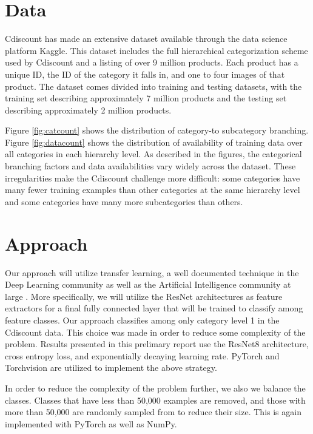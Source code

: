 \documentclass[10pt,twocolumn,letterpaper]{article}
\begin{document}
\section{Data}




Cdiscount has made an extensive dataset available through the data science platform Kaggle.
This dataset includes the full hierarchical categorization scheme used by Cdiscount and a listing of over 9 million products.
Each product has a unique ID, the ID of the category it falls in, and one to four images of that product.
The dataset comes divided into training and testing datasets, with the training set describing approximately 7 million products and the testing set describing approximately 2 million products.

Figure \ref{fig:catcount} shows the distribution of category-to subcategory branching.
Figure \ref{fig:datacount} shows the distribution of availability of training data over all categories in each hierarchy level.
As described in the figures, the categorical branching factors and data availabilities vary widely across the dataset.
These irregularities make the Cdiscount challenge more difficult: some categories have many fewer training examples than other categories at the same hierarchy level and some categories have many more subcategories than others.

\section{Approach}

Our approach will utilize transfer learning, a well documented technique in the Deep Learning community as well as the Artificial Intelligence community at large \cite{pan2010survey}. More specifically, we will utilize the ResNet \cite{he2016deep} architectures as feature extractors for a final fully connected layer that will be trained to classify among feature classes. Our approach classifies among only category level 1 in the Cdiscount data. This choice was made in order to reduce some complexity of the problem. Results presented in this prelimary report use the ResNet8 architecture, cross entropy loss, and exponentially decaying learning rate. PyTorch and Torchvision are utilized to implement the above strategy. 

In order to reduce the complexity of the problem further, we also we balance the classes. Classes that have less than 50,000 examples are removed, and those with more than 50,000 are randomly sampled from to reduce their size. This is again implemented with PyTorch as well as NumPy.
\end{document}
